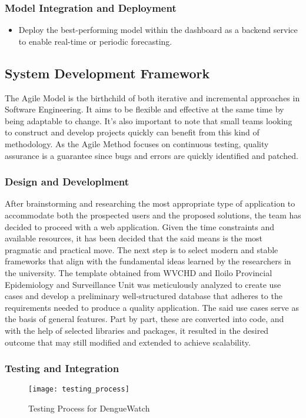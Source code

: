 \subsubsection{Model Integration and Deployment}
\begin{itemize}
	\item Deploy the best-performing model within the dashboard as a backend service to enable real-time or periodic forecasting.
\end{itemize}


\subsection{System Development Framework}
The Agile Model is the birthchild of both iterative and incremental approaches in Software Engineering. It aims to be flexible and effective at the same time by being adaptable to change. It's also important to note that small teams looking to construct and develop projects quickly can benefit from this kind of methodology. As the Agile Method focuses on continuous testing, quality assurance is a guarantee since bugs and errors are quickly identified and patched. 

\subsubsection{Design and Developlment}
After brainstorming and researching the most appropriate type of application to accommodate both the prospected users and the proposed solutions, the team has decided to proceed with a web application. Given the time constraints and available resources, it has been decided that the said means is the most pragmatic and practical move. The next step is to select modern and stable frameworks that align with the fundamental ideas learned by the researchers in the university. The template obtained from WVCHD and Iloilo Provincial Epidemiology and Surveillance Unit was meticulously analyzed to create use cases and develop a preliminary well-structured database that adheres to the requirements needed to produce a quality application. The said use cases serve as the basis of general features. Part by part, these are converted into code, and with the help of selected libraries and packages, it resulted in the desired outcome that may still modified and extended to achieve scalability. 

\subsubsection{Testing and Integration}
\begin{figure}[H]
	\centering
	\texttt{[image: testing\_process]}
	\caption{Testing Process for DengueWatch}
	\label{fig:testing-process}
\end{figure}

